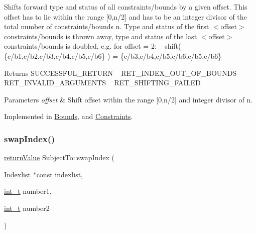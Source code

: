 Shifts forward type and status of all constraints/bounds by a given offset. This offset has to lie within the range \mbox{[}0,n/2\mbox{]} and has to be an integer divisor of the total number of constraints/bounds n. Type and status of the first $<$offset$>$ constraints/bounds is thrown away, type and status of the last $<$offset$>$ constraints/bounds is doubled, e.\+g. for offset = 2\+: ~\newline
shift( \{c/b1,c/b2,c/b3,c/b4,c/b5,c/b6\} ) = \{c/b3,c/b4,c/b5,c/b6,c/b5,c/b6\} \begin{DoxyReturn}{Returns}
S\+U\+C\+C\+E\+S\+S\+F\+U\+L\+\_\+\+R\+E\+T\+U\+RN ~\newline
 R\+E\+T\+\_\+\+I\+N\+D\+E\+X\+\_\+\+O\+U\+T\+\_\+\+O\+F\+\_\+\+B\+O\+U\+N\+DS ~\newline
 R\+E\+T\+\_\+\+I\+N\+V\+A\+L\+I\+D\+\_\+\+A\+R\+G\+U\+M\+E\+N\+TS ~\newline
 R\+E\+T\+\_\+\+S\+H\+I\+F\+T\+I\+N\+G\+\_\+\+F\+A\+I\+L\+ED 
\end{DoxyReturn}

\begin{DoxyParams}{Parameters}
{\em offset} & Shift offset within the range \mbox{[}0,n/2\mbox{]} and integer divisor of n. \\
\hline
\end{DoxyParams}


Implemented in \hyperlink{class_bounds_a05b63d074b95ae4d5fc4c7cfe11e7228}{Bounds}, and \hyperlink{class_constraints_a7605104071cb0396a8c426bfce82c49f}{Constraints}.

\mbox{\label{class_subject_to_aa67ba18d9afa09a0bad98a3d0d6b67e8}} 
\subsubsection{\texorpdfstring{swap\+Index()}{swapIndex()}}
{\footnotesize\ttfamily \hyperlink{_message_handling_8hpp_a81d556f613bfbabd0b1f9488c0fa865e}{return\+Value} Subject\+To\+::swap\+Index (\begin{DoxyParamCaption}\item[{\hyperlink{class_indexlist}{Indexlist} $\ast$const}]{indexlist,  }\item[{\hyperlink{_types_8hpp_ab6fd6105e64ed14a0c9281326f05e623}{int\+\_\+t}}]{number1,  }\item[{\hyperlink{_types_8hpp_ab6fd6105e64ed14a0c9281326f05e623}{int\+\_\+t}}]{number2 }\end{DoxyParamCaption})\hspace{0.3cm}{\ttfamily [protected]}}

